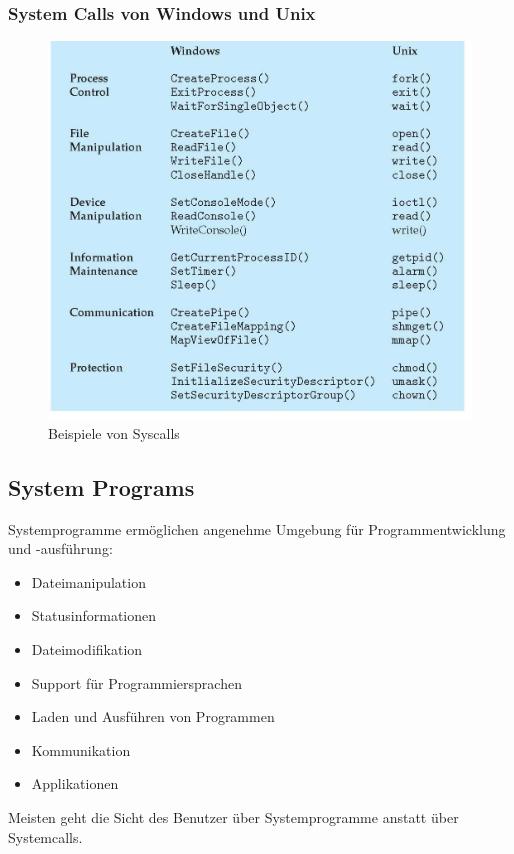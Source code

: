 \documentclass[a4paper]{scrreprt}
\begin{document}
\subsubsection{System Calls von Windows und Unix}
\begin{figure}[ht]
\centering
\includegraphics[scale=0.3]{graphics/syscall_examples.png}
\caption{Beispiele von Syscalls}
\end{figure}

\subsection{System Programs}
Systemprogramme ermöglichen angenehme Umgebung für Programmentwicklung und -ausführung:
\begin{itemize}
	\item Dateimanipulation
	\item Statusinformationen
	\item Dateimodifikation
	\item Support für Programmiersprachen
	\item Laden und Ausführen von Programmen
	\item Kommunikation
	\item Applikationen
\end{itemize}
Meisten geht die Sicht des Benutzer über Systemprogramme anstatt über Systemcalls.
\end{document}
